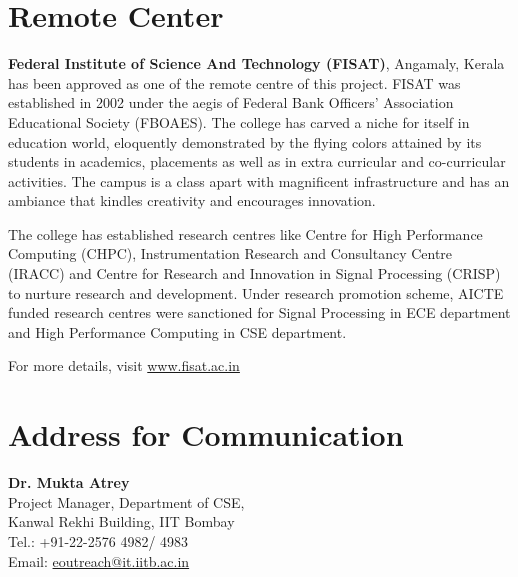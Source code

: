 \documentclass[notuble,10pt,a4paper]{leaflet}
\begin{document}
\newpage




\section{{\Large Remote Center}}
\textbf{Federal Institute of Science And Technology (FISAT)}, Angamaly, Kerala has been approved as one of the remote centre of this project. FISAT was established in 2002 under the aegis of Federal Bank Officers' Association Educational Society (FBOAES). The college has carved a niche for itself in education world, eloquently demonstrated by the flying colors attained by its students in academics, placements as well as in extra curricular and co-curricular activities. The campus is a class apart with magnificent infrastructure and has an ambiance that kindles creativity and encourages innovation.

The college has established research centres like Centre for High Performance Computing (CHPC), Instrumentation Research and Consultancy Centre (IRACC) and Centre for Research and Innovation in Signal Processing (CRISP) to nurture research and development. Under research promotion scheme, AICTE funded research centres were sanctioned for Signal Processing in ECE department and High Performance Computing in CSE department. 

For more details, visit \url{www.fisat.ac.in}

\section{{\Large Address for Communication}}
\textbf{Dr. Mukta Atrey}\\
Project Manager, Department of CSE,\\ 
Kanwal Rekhi Building, IIT Bombay\\
Tel.: +91-22-2576 4982/ 4983\\
Email:  \url{eoutreach@it.iitb.ac.in}
\end{document}
